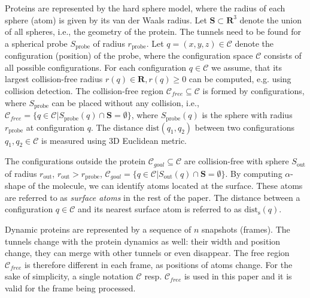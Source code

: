 \documentclass{llncs}
\def\C{\mathcal{C}}
\def\CF{\mathcal{C}_{free}}
\def\dist{\mathrm{dist}}
\def\dists{\mathrm{dist}_{\mathrm{s}}}
\def\probe{r_{\mathrm{probe}}}
\def\Sprobe{S_{\mathrm{probe}}}
\def\gprobe{r_{\mathrm{out}}}
\def\Sgprobe{S_{\mathrm{out}}}
\def\CG{\mathcal{C}_{goal}}
\def\SS{\mathbf{S}}
\begin{document}
Proteins are represented by the hard sphere model, where the radius of each sphere (atom) is given by its van der Waals radius.
Let $\SS \subset \mathbf{R}^3$ denote the union of all spheres, i.e., the geometry of the protein.
The tunnels need to be found for a spherical probe $\Sprobe$ of radius $\probe$.
Let $q=(x,y,z)\in\C$ denote the configuration (position) of the probe, where
the configuration space $\C$ consists of all possible configurations.
For each configuration $q\in\C$ we assume, that its largest collision-free radius $r(q) \in \mathbf{R}, r(q)\ge 0$ can be computed, e.g.
using collision detection.
The collision-free region $\CF \subseteq \C$ is formed by configurations, where $\Sprobe$ can be placed without any collision, i.e., 
$\CF = \{q \in \C | \Sprobe(q) \cap \SS = \emptyset\}$, where $\Sprobe(q)$ is the sphere with radius $\probe$ at configuration $q$.
The distance $\dist(q_1,q_2)$  between two configurations $q_1,q_2\in\C$ is measured using 3D Euclidean metric.

The configurations outside the protein $\CG \subseteq \C$ are collision-free with sphere $\Sgprobe$ of radius $\gprobe$, $\gprobe> \probe$,
$\CG=\{q\in \C| \Sgprobe(q) \cap \SS = \emptyset \}$.
By computing $\alpha$-shape of the molecule, we can identify atoms located at the surface. 
These atoms are referred to as {\sl surface atoms} in the rest of the paper.
The distance between a configuration $q \in \C$ and its nearest surface atom is referred to as $\dists(q)$.

Dynamic proteins are represented by a sequence of $n$ snapshots (frames).
The tunnels change with the protein dynamics as well: their width and position change, they can merge with other tunnels
or even disappear.
The free region $\CF$ is therefore different in each frame, as positions of atoms change.
For the sake of simplicity, a single notation $\C$ resp. $\CF$ is used in this paper and it is valid for the frame being processed.
\end{document}

